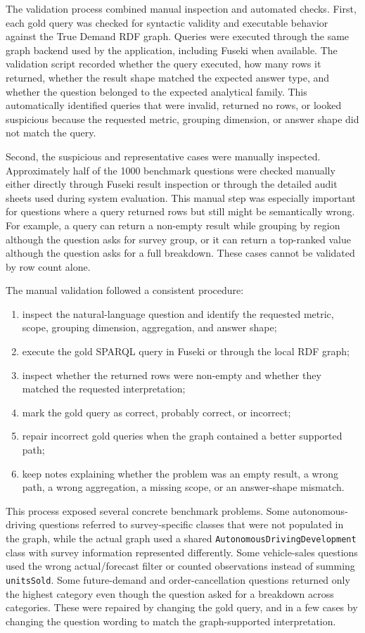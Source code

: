\documentclass[
  12pt,
  english,
  oneside]{report}
\begin{document}
The validation process combined manual inspection and automated checks. First, each gold query was checked for syntactic validity and executable behavior against the True Demand RDF graph. Queries were executed through the same graph backend used by the application, including Fuseki when available. The validation script recorded whether the query executed, how many rows it returned, whether the result shape matched the expected answer type, and whether the question belonged to the expected analytical family. This automatically identified queries that were invalid, returned no rows, or looked suspicious because the requested metric, grouping dimension, or answer shape did not match the query.

Second, the suspicious and representative cases were manually inspected. Approximately half of the 1000 benchmark questions were checked manually either directly through Fuseki result inspection or through the detailed audit sheets used during system evaluation. This manual step was especially important for questions where a query returned rows but still might be semantically wrong. For example, a query can return a non-empty result while grouping by region although the question asks for survey group, or it can return a top-ranked value although the question asks for a full breakdown. These cases cannot be validated by row count alone.

The manual validation followed a consistent procedure:

\begin{enumerate}
    \item inspect the natural-language question and identify the requested metric, scope, grouping dimension, aggregation, and answer shape;
    \item execute the gold SPARQL query in Fuseki or through the local RDF graph;
    \item inspect whether the returned rows were non-empty and whether they matched the requested interpretation;
    \item mark the gold query as correct, probably correct, or incorrect;
    \item repair incorrect gold queries when the graph contained a better supported path;
    \item keep notes explaining whether the problem was an empty result, a wrong path, a wrong aggregation, a missing scope, or an answer-shape mismatch.
\end{enumerate}

This process exposed several concrete benchmark problems. Some autonomous-driving questions referred to survey-specific classes that were not populated in the graph, while the actual graph used a shared \texttt{AutonomousDrivingDevelopment} class with survey information represented differently. Some vehicle-sales questions used the wrong actual/forecast filter or counted observations instead of summing \texttt{unitsSold}. Some future-demand and order-cancellation questions returned only the highest category even though the question asked for a breakdown across categories. These were repaired by changing the gold query, and in a few cases by changing the question wording to match the graph-supported interpretation.
\end{document}
